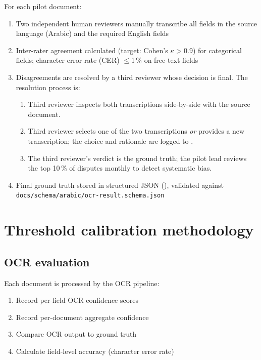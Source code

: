 For each pilot document:
\begin{enumerate}
  \item Two independent human reviewers manually transcribe all fields
        in the source language (Arabic) and the required English fields
  \item Inter-rater agreement calculated (target: Cohen's $\kappa > 0.9$)
        for categorical fields; character error rate (CER) $\le$1\,\%
        on free-text fields
  \item Disagreements are resolved by a third reviewer whose decision is
        final. The resolution process is:
        \begin{enumerate}
          \item Third reviewer inspects both transcriptions side-by-side
                with the source document.
          \item Third reviewer selects one of the two transcriptions
                \emph{or} provides a new transcription; the choice and
                rationale are logged to
                .
          \item The third reviewer's verdict is the ground truth; the
                pilot lead reviews the top 10\,\% of disputes monthly
                to detect systematic bias.
        \end{enumerate}
  \item Final ground truth stored in structured JSON
        (), validated
        against \texttt{docs/schema/arabic/ocr-result.schema.json}
\end{enumerate}

\section{Threshold calibration methodology}

\subsection{OCR evaluation}

Each document is processed by the OCR pipeline:
\begin{enumerate}
  \item Record per-field OCR confidence scores
  \item Record per-document aggregate confidence
  \item Compare OCR output to ground truth
  \item Calculate field-level accuracy (character error rate)
\end{enumerate}

